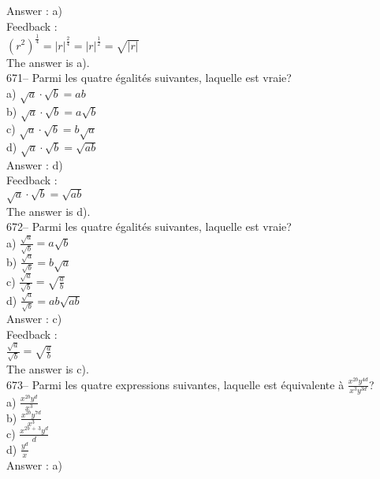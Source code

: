 \documentclass[letterpaper, 12pt]{article}
\begin{document}
Answer : a)\\

Feedback : \\
$\left( r^{2}\right)^\frac{1}{4}=|r|^\frac{2}{4}=|r|^\frac{1}{2}=\sqrt{|r|}$\\
The answer is a).\\

671-- Parmi les quatre \'egalit\'es suivantes, laquelle est vraie?\\
a) $\sqrt{a}\cdot\sqrt{b}=ab$\\
b) $\sqrt{a}\cdot\sqrt{b}=a\sqrt{b}$\\
c) $\sqrt{a}\cdot\sqrt{b}=b\sqrt{a}$\\
d) $\sqrt{a}\cdot\sqrt{b}=\sqrt{ab}$\\

Answer : d)\\

Feedback : \\
$\sqrt{a}\cdot\sqrt{b}=\sqrt{ab}$\\
The answer is d).\\

672-- Parmi les quatre \'egalit\'es suivantes, laquelle est vraie?\\
a) $\frac{\sqrt{a}}{\sqrt{b}}=a\sqrt{b}$\\[2mm]
b) $\frac{\sqrt{a}}{\sqrt{b}}=b\sqrt{a}$\\[2mm]
c) $\frac{\sqrt{a}}{\sqrt{b}}=\sqrt{\frac{a}{b}}$\\[2mm]
d) $\frac{\sqrt{a}}{\sqrt{b}}=ab\sqrt{ab}$\\

Answer : c)\\

Feedback : \\[2mm]
$\frac{\sqrt{a}}{\sqrt{b}}=\sqrt{\frac{a}{b}}$\\[2mm]
The answer is c).\\

673-- Parmi les quatre expressions suivantes, laquelle est \'equivalente \`a
$\frac{x^{2b}y^{4d}}{x^{3}y^{3d}}$?\\
a) $\frac{x^{2b}y^{d}}{x^{3}}$\\[2mm]
b) $\frac{x^{2b}y^{7d}}{x^{3}}$\\[2mm]
c) $\frac{x^{2b\,+\,3}y^{d}}{d}$\\[2mm]
d) $\frac{y^{d}}{x}$\\

Answer : a)\\
\end{document}
